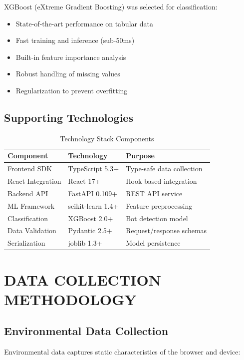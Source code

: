 XGBoost (eXtreme Gradient Boosting) was selected for classification:
\begin{itemize}
    \item State-of-the-art performance on tabular data
    \item Fast training and inference (sub-50ms)
    \item Built-in feature importance analysis
    \item Robust handling of missing values
    \item Regularization to prevent overfitting
\end{itemize}

\subsection{Supporting Technologies}

\begin{table}[H]
\centering
\caption{Technology Stack Components}
\label{tab:tech_stack}
\begin{tabular}{|l|l|l|}
\hline
\textbf{Component} & \textbf{Technology} & \textbf{Purpose} \\
\hline
Frontend SDK & TypeScript 5.3+ & Type-safe data collection \\
\hline
React Integration & React 17+ & Hook-based integration \\
\hline
Backend API & FastAPI 0.109+ & REST API service \\
\hline
ML Framework & scikit-learn 1.4+ & Feature preprocessing \\
\hline
Classification & XGBoost 2.0+ & Bot detection model \\
\hline
Data Validation & Pydantic 2.5+ & Request/response schemas \\
\hline
Serialization & joblib 1.3+ & Model persistence \\
\hline
\end{tabular}
\end{table}

\section{DATA COLLECTION METHODOLOGY}

\subsection{Environmental Data Collection}

Environmental data captures static characteristics of the browser and device:

